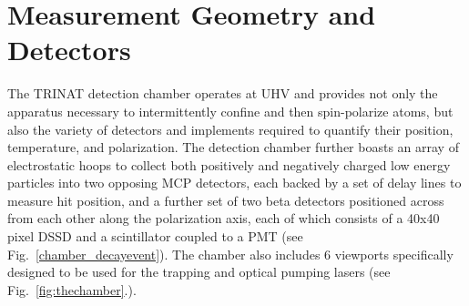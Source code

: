 \section{Measurement Geometry and Detectors}
\label{sec:geometry}
The TRINAT detection chamber operates at \ac{UHV} 
and provides not only the apparatus necessary to intermittently confine and then spin-polarize atoms, but also the variety of detectors and implements required to quantify their position, temperature, and polarization.  The detection chamber further boasts an array of electrostatic hoops to collect both positively and negatively charged low energy particles into two opposing \ac{MCP} detectors, each backed by a set of delay lines to measure hit position, and a further set of two beta detectors positioned across from each other along the polarization axis, each of which consists of a 40x40 pixel 
\ac{DSSD} %
and a scintillator coupled to a \ac{PMT} 
(see Fig.~\ref{chamber_decayevent}). The chamber also includes 6 viewports specifically designed to be used for the trapping and optical pumping lasers (see Fig.~\ref{fig:thechamber}.).



